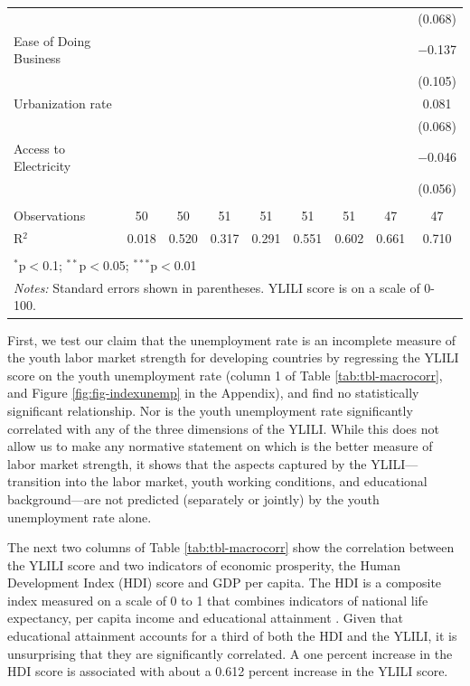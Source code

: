 \documentclass[
  a4paper, twoside, 12pt]{book}
\begin{document}
\begin{singlespace}
\begin{table}[H]
\begin{tabular}{@{\extracolsep{-5pt}}lcccccccc}
  &  &  &  &  &  &  &  & (0.068) \\ 
  Ease of Doing Business &  &  &  &  &  &  &  & $-$0.137 \\ 
  &  &  &  &  &  &  &  & (0.105) \\ 
  Urbanization rate &  &  &  &  &  &  &  & 0.081 \\ 
  &  &  &  &  &  &  &  & (0.068) \\ 
  Access to Electricity &  &  &  &  &  &  &  & $-$0.046 \\ 
  &  &  &  &  &  &  &  & (0.056) \\ 
 \hline \\[-1.8ex] 
Observations & 50 & 50 & 51 & 51 & 51 & 51 & 47 & 47 \\ 
R$^{2}$ & 0.018 & 0.520 & 0.317 & 0.291 & 0.551 & 0.602 & 0.661 & 0.710 \\ 
\hline 
\hline \\[-1.8ex] 
\multicolumn{9}{l}{$^{*}$p$<$0.1; $^{**}$p$<$0.05; $^{***}$p$<$0.01} \\ 
\multicolumn{9}{l}{\textit{Notes:} Standard errors shown in parentheses. YLILI score is on a scale of 0-100.} \\ 
\end{tabular} 
\end{table} 
\end{singlespace}

First, we test our claim that the unemployment rate is an incomplete measure of the youth labor market strength for developing countries by regressing the YLILI score on the youth unemployment rate (column 1 of Table \ref{tab:tbl-macrocorr}, and Figure \ref{fig:fig-indexunemp} in the Appendix), and find no statistically significant relationship. Nor is the youth unemployment rate significantly correlated with any of the three dimensions of the YLILI. While this does not allow us to make any normative statement on which is the better measure of labor market strength, it shows that the aspects captured by the YLILI--- transition into the labor market, youth working conditions, and educational background---are not predicted (separately or jointly) by the youth unemployment rate alone.

The next two columns of Table \ref{tab:tbl-macrocorr} show the correlation between the YLILI score and two indicators of economic prosperity, the Human Development Index (HDI) score and GDP per capita. The HDI is a composite index measured on a scale of 0 to 1 that combines indicators of national life expectancy, per capita income and educational attainment \autocite{undp1990}. Given that educational attainment accounts for a third of both the HDI and the YLILI, it is unsurprising that they are significantly correlated. A one percent increase in the HDI score is associated with about a 0.612 percent increase in the YLILI score.
\end{document}
